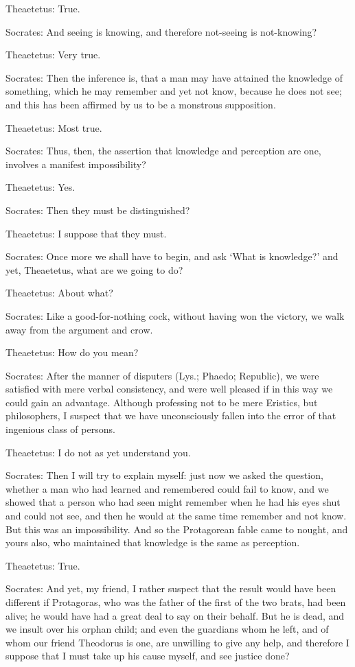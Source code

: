 Theaetetus: True.

Socrates: And seeing is knowing, and therefore not-seeing is
not-knowing?

Theaetetus: Very true.

Socrates: Then the inference is, that a man may have attained the
knowledge of something, which he may remember and yet not know, because
he does not see; and this has been affirmed by us to be a monstrous
supposition.

Theaetetus: Most true.

Socrates: Thus, then, the assertion that knowledge and perception are
one, involves a manifest impossibility?

Theaetetus: Yes.

Socrates: Then they must be distinguished?

Theaetetus: I suppose that they must.

Socrates: Once more we shall have to begin, and ask `What is knowledge?'
and yet, Theaetetus, what are we going to do?

Theaetetus: About what?

Socrates: Like a good-for-nothing cock, without having won the victory,
we walk away from the argument and crow.

Theaetetus: How do you mean?

Socrates: After the manner of disputers (Lys.; Phaedo; Republic), we
were satisfied with mere verbal consistency, and were well pleased if in
this way we could gain an advantage. Although professing not to be mere
Eristics, but philosophers, I suspect that we have unconsciously fallen
into the error of that ingenious class of persons.

Theaetetus: I do not as yet understand you.

Socrates: Then I will try to explain myself: just now we asked the
question, whether a man who had learned and remembered could fail to
know, and we showed that a person who had seen might remember when he
had his eyes shut and could not see, and then he would at the same
time remember and not know. But this was an impossibility. And so the
Protagorean fable came to nought, and yours also, who maintained that
knowledge is the same as perception.

Theaetetus: True.

Socrates: And yet, my friend, I rather suspect that the result would
have been different if Protagoras, who was the father of the first of
the two brats, had been alive; he would have had a great deal to say on
their behalf. But he is dead, and we insult over his orphan child; and
even the guardians whom he left, and of whom our friend Theodorus is
one, are unwilling to give any help, and therefore I suppose that I must
take up his cause myself, and see justice done?

